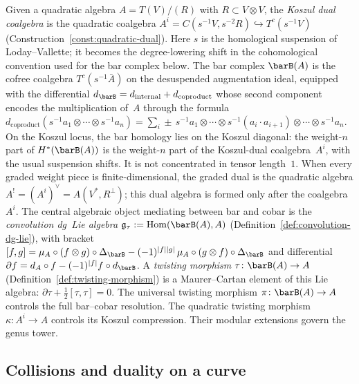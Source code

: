 Given a quadratic algebra $A = T(V)/(R)$ with
$R \subset V \otimes V$, the \emph{Koszul dual coalgebra} is
the quadratic coalgebra
$A^i=C(s^{-1}V,s^{-2}R)\hookrightarrow T^c(s^{-1}V)$
(Construction~\ref{const:quadratic-dual}). Here $s$ is the
homological suspension of Loday--Vallette; it becomes the
degree-lowering shift in the cohomological convention used for the
bar complex below. The bar complex
$\barB(A)$ is the cofree coalgebra $T^c(s^{-1}\bar{A})$ on the
desuspended augmentation ideal, equipped with the differential
$d_{\barB} = d_{\mathrm{internal}} + d_{\mathrm{coproduct}}$
whose second component encodes the multiplication of~$A$ through
the formula
$d_{\mathrm{coproduct}}(s^{-1}a_1 \otimes \cdots \otimes s^{-1}a_n)
= \sum_{i} \pm\, s^{-1}a_1 \otimes \cdots \otimes
s^{-1}(a_i \cdot a_{i+1}) \otimes \cdots \otimes s^{-1}a_n$.
On the Koszul locus, the bar homology lies on the Koszul
diagonal: the weight-$n$ part of $H^*(\barB(A))$ is the
weight-$n$ part of the Koszul-dual coalgebra~$A^i$, with the
usual suspension shifts. It is not concentrated in tensor
length~$1$. When every graded weight piece is finite-dimensional,
the graded dual is the quadratic algebra
$A^!=(A^i)^\vee=A(V^*,R^\perp)$; this dual algebra is formed only
after the coalgebra~$A^i$.
The central algebraic
object mediating between bar and cobar is the
\emph{convolution dg~Lie algebra}
$\mathfrak{g}_\tau := \mathrm{Hom}(\barB(A), A)$
(Definition~\ref{def:convolution-dg-lie}), with bracket
$[f, g] = \mu_A \circ (f \otimes g) \circ \Delta_{\barB}
- (-1)^{|f||g|}\, \mu_A \circ (g \otimes f) \circ \Delta_{\barB}$
and differential
$\partial f = d_A \circ f - (-1)^{|f|} f \circ d_{\barB}$.
A \emph{twisting morphism}
$\tau \colon \barB(A) \to A$
(Definition~\ref{def:twisting-morphism}) is a Maurer--Cartan
element of this Lie algebra:
$\partial\tau + \tfrac{1}{2}[\tau, \tau] = 0$.
The universal twisting morphism $\pi\colon\barB(A)\to A$ controls
the full bar--cobar resolution. The quadratic twisting morphism
$\kappa\colon A^i\to A$ controls its Koszul compression. Their
modular extensions govern the genus tower.

\subsection*{Collisions and duality on a curve}

